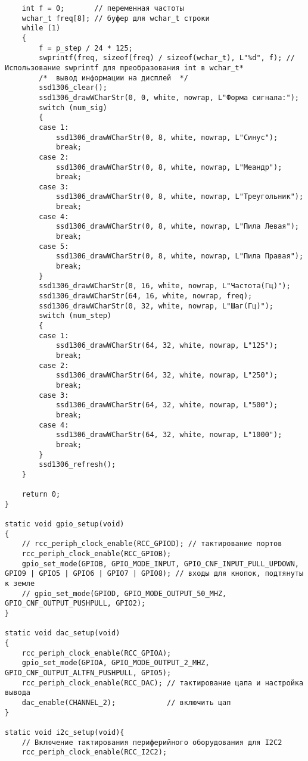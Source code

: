 \begin{code}
\begin{verbatim}
    int f = 0;       // переменная частоты
    wchar_t freq[8]; // буфер для wchar_t строки
    while (1)
    {
        f = p_step / 24 * 125;
        swprintf(freq, sizeof(freq) / sizeof(wchar_t), L"%d", f); // Использование swprintf для преобразования int в wchar_t*
        /*  вывод информации на дисплей  */
        ssd1306_clear();
        ssd1306_drawWCharStr(0, 0, white, nowrap, L"Форма сигнала:");
        switch (num_sig)
        {
        case 1:
            ssd1306_drawWCharStr(0, 8, white, nowrap, L"Синус");
            break;
        case 2:
            ssd1306_drawWCharStr(0, 8, white, nowrap, L"Меандр");
            break;
        case 3:
            ssd1306_drawWCharStr(0, 8, white, nowrap, L"Треугольник");
            break;
        case 4:
            ssd1306_drawWCharStr(0, 8, white, nowrap, L"Пила Левая");
            break;
        case 5:
            ssd1306_drawWCharStr(0, 8, white, nowrap, L"Пила Правая");
            break;
        }
        ssd1306_drawWCharStr(0, 16, white, nowrap, L"Частота(Гц)");
        ssd1306_drawWCharStr(64, 16, white, nowrap, freq);
        ssd1306_drawWCharStr(0, 32, white, nowrap, L"Шаг(Гц)");
        switch (num_step)
        {
        case 1:
            ssd1306_drawWCharStr(64, 32, white, nowrap, L"125");
            break;
        case 2:
            ssd1306_drawWCharStr(64, 32, white, nowrap, L"250");
            break;
        case 3:
            ssd1306_drawWCharStr(64, 32, white, nowrap, L"500");
            break;
        case 4:
            ssd1306_drawWCharStr(64, 32, white, nowrap, L"1000");
            break;
        }
        ssd1306_refresh();
    }

    return 0;
}

static void gpio_setup(void)
{
    // rcc_periph_clock_enable(RCC_GPIOD); // тактирование портов
    rcc_periph_clock_enable(RCC_GPIOB);
    gpio_set_mode(GPIOB, GPIO_MODE_INPUT, GPIO_CNF_INPUT_PULL_UPDOWN, GPIO9 | GPIO5 | GPIO6 | GPIO7 | GPIO8); // входы для кнопок, подтянуты к земле
    // gpio_set_mode(GPIOD, GPIO_MODE_OUTPUT_50_MHZ, GPIO_CNF_OUTPUT_PUSHPULL, GPIO2);
}

static void dac_setup(void)
{
    rcc_periph_clock_enable(RCC_GPIOA);
    gpio_set_mode(GPIOA, GPIO_MODE_OUTPUT_2_MHZ, GPIO_CNF_OUTPUT_ALTFN_PUSHPULL, GPIO5);
    rcc_periph_clock_enable(RCC_DAC); // тактирование цапа и настройка вывода
    dac_enable(CHANNEL_2);            // включить цап
}

static void i2c_setup(void){
    // Включение тактирования периферийного оборудования для I2C2
    rcc_periph_clock_enable(RCC_I2C2);
    

\end{verbatim}
\end{code}
